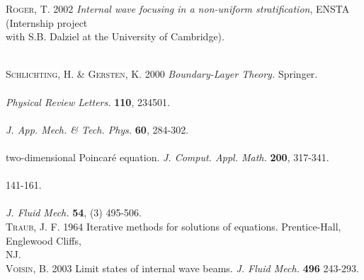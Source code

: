 \documentclass[a4paper]{article}
\numberwithin{equation}{section}
\begin{document}
\hypertarget{ref 50}{\textsc{Roger, T.} 2002 \emph{Internal wave focusing in a non-uniform stratification}, ENSTA (Internship project \\\hspace*{1.1cm} with S.B. Dalziel at the University of Cambridge).}\\
\hypertarget{ref 28}{\textsc{Schlichting, H. \& Gersten, K.} 2000 \emph{Boundary-Layer Theory.} Springer.}\\
\hypertarget{ref 35}{ \\\hspace*{1.1cm} \emph{Physical Review Letters.} \textbf{110}, 234501.}\\
\hypertarget{ref 19}{\\\hspace*{1.1cm} \emph{J. App. Mech. \& Tech. Phys.} \textbf{60}, 284-302.}\\
\hypertarget{ref 15}{\\\hspace*{1.1cm} two-dimensional Poincaré equation. \emph{J. Comput. Appl. Math.} \textbf{200}, 317-341.}\\
\hypertarget{ref 22}{ \\\hspace*{1.1cm} 141-161.}\\
\hypertarget{ref 21}{ \\\hspace*{1.1cm} \emph{J. Fluid Mech.} \textbf{54}, (3) 495-506.}\\
\hypertarget{ref 44}{\textsc{Traub, J. F.} 1964 Iterative methods for solutions of equations. Prentice-Hall, Englewood Cliffs, \\\hspace*{1.1cm} NJ.}\\
\hypertarget{ref 23}{\textsc{Voisin, B.} 2003 Limit states of internal wave beams. \emph{J. Fluid Mech.} \textbf{496} 243-293.}\\
\end{document}
